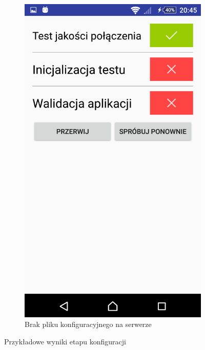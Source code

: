 \documentclass[archivemod, eng]{mgr}
\begin{document}
\begin{figure}[ht]
\begin{subfigure}{.32\textwidth}
						\includegraphics[width=.9\linewidth]{walidacja_brak_pliku_konfiguracyjnego.png}
						\caption{Brak pliku konfiguracyjnego na serwerze}
						\label{fig:walidacja_brak_pliku}
					\end{subfigure}
					\caption{Przykładowe wyniki etapu konfiguracji}
					\label{fig:wyglad_aplikacji_3}
				\end{figure}
				
\end{document}

